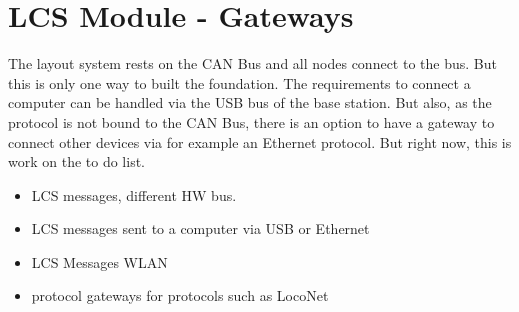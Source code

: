 \chapter{LCS Module - Gateways}

The layout system rests on the CAN Bus and all nodes connect to the bus. But this is only one way to built the foundation. The requirements to connect a computer can be handled via the USB bus of the base station. But also, as the protocol is not bound to the CAN Bus, there is an option to have a gateway to connect other devices via for example an Ethernet protocol. But right now, this is work on the to do list.

\begin{itemize}
\item LCS messages, different HW bus.
\item LCS messages sent to a computer via USB or Ethernet
\item LCS Messages WLAN
\item protocol gateways for protocols such as LocoNet
\end{itemize}

